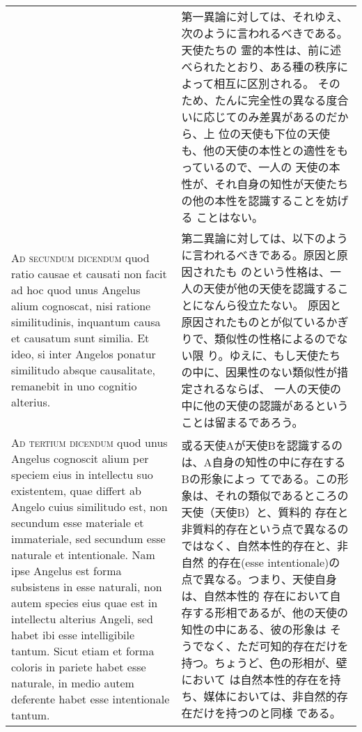 \documentclass[10pt]{jsarticle} %
\begin{document}
\begin{longtable}{p{21em}p{21em}}
&

第一異論に対しては、それゆえ、次のように言われるべきである。天使たちの
霊的本性は、前に述べられたとおり、ある種の秩序によって相互に区別される。
そのため、たんに完全性の異なる度合いに応じてのみ差異があるのだから、上
位の天使も下位の天使も、他の天使の本性との適性をもっているので、一人の
天使の本性が、それ自身の知性が天使たちの他の本性を認識することを妨げる
ことはない。

\\


{\scshape Ad secundum dicendum} quod ratio causae et causati non facit
ad hoc quod unus Angelus alium cognoscat, nisi ratione similitudinis,
inquantum causa et causatum sunt similia. Et ideo, si inter Angelos
ponatur similitudo absque causalitate, remanebit in uno cognitio
alterius.

&

第二異論に対しては、以下のように言われるべきである。原因と原因されたも
のという性格は、一人の天使が他の天使を認識することになんら役立たない。
原因と原因されたものとが似ているかぎりで、類似性の性格によるのでない限
り。ゆえに、もし天使たちの中に、因果性のない類似性が措定されるならば、
一人の天使の中に他の天使の認識があるということは留まるであろう。

\\


{\scshape Ad tertium dicendum} quod unus Angelus cognoscit alium per
speciem eius in intellectu suo existentem, quae differt ab Angelo
cuius similitudo est, non secundum esse materiale et immateriale, sed
secundum esse naturale et intentionale. Nam ipse Angelus est forma
subsistens in esse naturali, non autem species eius quae est in
intellectu alterius Angeli, sed habet ibi esse intelligibile
tantum. Sicut etiam et forma coloris in pariete habet esse naturale,
in medio autem deferente habet esse intentionale tantum.

&

或る天使Aが天使Bを認識するのは、A自身の知性の中に存在するBの形象によっ
てである。この形象は、それの類似であるところの天使（天使B）と、質料的
存在と非質料的存在という点で異なるのではなく、自然本性的存在と、非自然
的存在(esse intentionale)の点で異なる。つまり、天使自身は、自然本性的
存在において自存する形相であるが、他の天使の知性の中にある、彼の形象は
そうでなく、ただ可知的存在だけを持つ。ちょうど、色の形相が、壁において
は自然本性的存在を持ち、媒体においては、非自然的存在だけを持つのと同様
である。

\\



\end{longtable}
\end{document}

